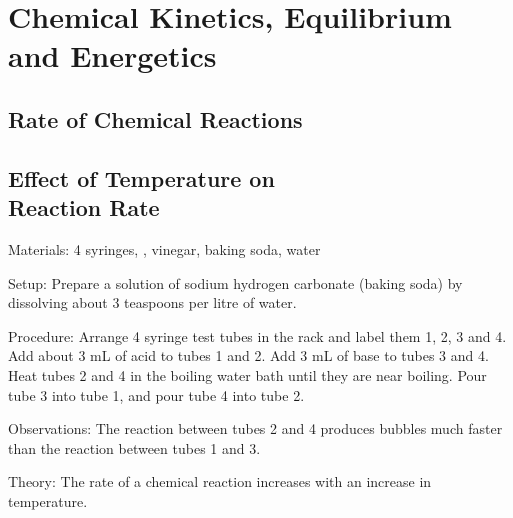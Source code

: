 \section{Chemical Kinetics, Equilibrium and Energetics} 

\begin{multicols}{2}


\section*{Rate of Chemical Reactions} 


\subsection[Effect of Temperature on Reaction Rate]{Effect of Temperature on \hfill \\ Reaction Rate} 


\begin{description*}
\item[Materials:]{4 syringes, , vinegar, baking soda, water }
\item[Setup:]{Prepare a solution of sodium hydrogen carbonate (baking soda) by dissolving about 3 teaspoons per litre of water.}
\item[Procedure:]{Arrange 4 syringe test tubes in the rack and label them 1, 2, 3 and 4. Add about 3 mL of acid to tubes 1 and 2. Add 3 mL of base to tubes 3 and 4. Heat tubes 2 and 4 in the boiling water bath until they are near boiling. Pour tube 3 into tube 1, and pour tube 4 into tube 2.}
\item[Observations:]{The reaction between tubes 2 and 4 produces bubbles much faster than the reaction between tubes 1 and 3.}
\item[Theory:]{The rate of a chemical reaction increases with an increase in temperature.}
\end{description*}


\end{multicols}
